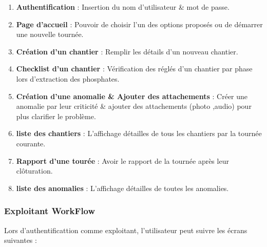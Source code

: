 \begin{enumerate}
\item \textbf{Authentification} : Insertion du nom d'utilisateur \& mot de passe.

\item \textbf{Page d'accueil} : Pouvoir de choisir l'un des options propos\'es ou de d\'emarrer une nouvelle tourn\'ee. 

\item \textbf{Cr\'eation d'un chantier} : Remplir les d\'etails d'un nouveau chantier.

\item \textbf{Checklist d'un chantier} : V\'erification des r\'egl\'es d'un chantier par phase lors d'extraction des phosphates.

\item \textbf{Cr\'eation d'une anomalie \& Ajouter des attachements} : Cr\'eer une anomalie par leur criticit\'e \& ajouter des attachements (photo ,audio) pour plus clarifier le probl\`eme.

\item \textbf{liste des chantiers} : L'affichage d\'etailles de tous les chantiers par la tourn\'ee courante.

\item \textbf{Rapport d'une tour\'ee} : Avoir le rapport de la tourn\'ee apr\`es leur cl\^oturation.

\item \textbf{liste des anomalies} : L'affichage d\'etailles de toutes les anomalies.
\end{enumerate}

\subsubsection{Exploitant WorkFlow}

Lors d'authentificattion comme exploitant, l'utilisateur peut suivre les \'ecrans suivantes :

